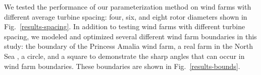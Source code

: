 \documentclass[wes, manuscript]{copernicus}
\begin{document}
We tested the performance of our parameterization method on wind farms with different average turbine spacing: four, six, and eight rotor diameters shown in Fig.~\ref{results-spacing}.
In addition to testing wind farms with different turbine spacing, we modeled and optimized several different wind farm boundaries in this study: the boundary of the Princess Amalia wind farm, a real farm in the North Sea \citep{van2012maximum,gebraad2015maximum,kanev2018active}, a circle, and a square to demonstrate the sharp angles that can occur in wind farm boundaries. These boundaries are shown in %
Fig.~\ref{results-bounds}.
%
%
%
%
\end{document}
